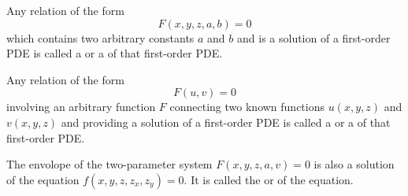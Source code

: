 \begin{definition}
    Any relation of the form \begin{equation*}
        F(x,y,z,a,b) = 0
    \end{equation*}
    which contains two arbitrary constants $a$ and $b$ and is a solution of a first-order PDE is called a  or a  of that first-order PDE.
\end{definition}

\begin{definition}
    Any relation of the form $$F(u,v) = 0$$ involving an arbitrary function $F$ connecting two known functions $u(x,y,z)$ and $v(x,y,z)$ and providing a solution of a first-order PDE is called a  or a  of that first-order PDE.
\end{definition}

\begin{definition}
    The envolope of the two-parameter system $F(x,y,z,a,v) = 0$ is also a solution of the equation $f(x,y,z,z_x,z_y) = 0$. It is called the  or  of the equation.
\end{definition}


